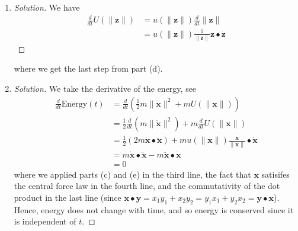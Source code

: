 \documentclass{article}
\begin{document}
\begin{enumerate}
\begin{proof}[Solution]
\begin{align*}
			&= \frac{1}{2}(x_1^2 + x_2^2)^{-1/2}(2x_1\dot{x_1} + 2x_2\dot{x_2})\\
			&= \frac{1}{\sqrt{x_1^2 + x_2^2}}(x_1\dot{x_1} + x_2\dot{x_2})\\
			&= \frac{1}{\lVert \mathbf{x} \rVert} \mathbf{x} \bullet \dot{\mathbf{x}}
		\end{align*}
	\end{proof}
	\item \begin{proof}[Solution]\let\qed\relax
		We have
		\begin{align*}
			\frac{d}{dt}U(\lVert\mathbf{z}\rVert)
			&= u(\lVert \mathbf{z} \rVert) \frac{d}{dt}\lVert \mathbf{z} \rVert\\
			&= u(\lVert \mathbf{z} \rVert)\frac{1}{\lVert \mathbf{z}
			\rVert} \mathbf{z} \bullet \dot{\mathbf{z}}
		\end{align*}
	\end{proof}
	where we get the last step from part (d).
	\item \begin{proof}[Solution]\let\qed\relax
		We take the derivative of the energy, see
		\begin{align*}
			\frac{d}{dt} \text{Energy}(t)
			&= \frac{d}{dt}\left(\frac{1}{2} m\lVert \dot{\mathbf{x}}\rVert^2 
			+ mU(\lVert \mathbf{x} \rVert)\right)\\
			&= \frac12 \frac{d}{dt}(m\lVert \dot{\mathbf{x}}\rVert^2)
			+ m\frac{d}{dt} U(\lVert \mathbf{x} \rVert)\\
			&= \frac{1}{2}(2m\dot{\mathbf{x}}\bullet\ddot{\mathbf{x}})
			+ mu(\lVert \mathbf{x} \rVert)
			\frac{\mathbf{x}}{\lVert \mathbf{x}\rVert}\bullet\dot{\mathbf{x}}\\
			&= m\dot{\mathbf{x}}\bullet\ddot{\mathbf{x}}
			- m \ddot{\mathbf{x}}\bullet \dot{\mathbf{x}}\\
			&= 0
		\end{align*}
		where we applied parts (c) and (e) in the third line,
		the fact that $\mathbf{x}$ satisifes the central force law in the fourth line,
		and the commutativity of the dot product in the last line
		(since $\mathbf{x}\bullet \mathbf{y} = x_1y_1 + x_2y_2 = y_1x_1 + y_2x_2
		= \mathbf{y}\bullet\mathbf{x}$).
		Hence, energy does not change with time,
		and so energy is conserved since it is independent of $t$.
	\end{proof}
\end{enumerate}
\end{document}

